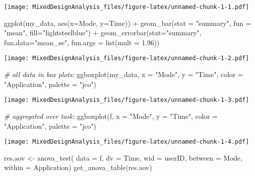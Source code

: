 \documentclass[
]{article}
\newenvironment{Shaded}{\begin{snugshade}}{\end{snugshade}}
\newcommand{\AttributeTok}[1]{\textcolor[rgb]{0.77,0.63,0.00}{#1}}
\newcommand{\CommentTok}[1]{\textcolor[rgb]{0.56,0.35,0.01}{\textit{#1}}}
\newcommand{\FloatTok}[1]{\textcolor[rgb]{0.00,0.00,0.81}{#1}}
\newcommand{\FunctionTok}[1]{\textcolor[rgb]{0.00,0.00,0.00}{#1}}
\newcommand{\NormalTok}[1]{#1}
\newcommand{\OtherTok}[1]{\textcolor[rgb]{0.56,0.35,0.01}{#1}}
\newcommand{\SpecialCharTok}[1]{\textcolor[rgb]{0.00,0.00,0.00}{#1}}
\newcommand{\StringTok}[1]{\textcolor[rgb]{0.31,0.60,0.02}{#1}}
\begin{document}
\texttt{[image: MixedDesignAnalysis\_files/figure-latex/unnamed-chunk-1-1.pdf]}

\begin{Shaded}
\begin{Highlighting}[]
\FunctionTok{ggplot}\NormalTok{(my\_data, }\FunctionTok{aes}\NormalTok{(}\AttributeTok{x=}\NormalTok{Mode, }\AttributeTok{y=}\NormalTok{Time)) }\SpecialCharTok{+} \FunctionTok{geom\_bar}\NormalTok{(}\AttributeTok{stat =} \StringTok{"summary"}\NormalTok{, }\AttributeTok{fun =} \StringTok{"mean"}\NormalTok{, }\AttributeTok{fill=}\StringTok{"lightsteelblue"}\NormalTok{) }\SpecialCharTok{+} \FunctionTok{geom\_errorbar}\NormalTok{(}\AttributeTok{stat=}\StringTok{"summary"}\NormalTok{, }\AttributeTok{fun.data=}\StringTok{"mean\_se"}\NormalTok{, }\AttributeTok{fun.args =} \FunctionTok{list}\NormalTok{(}\AttributeTok{mult =} \FloatTok{1.96}\NormalTok{))}
\end{Highlighting}
\end{Shaded}

\texttt{[image: MixedDesignAnalysis\_files/figure-latex/unnamed-chunk-1-2.pdf]}

\begin{Shaded}
\begin{Highlighting}[]
\CommentTok{\# all data in box plots: }
\FunctionTok{ggboxplot}\NormalTok{(my\_data, }\AttributeTok{x =} \StringTok{"Mode"}\NormalTok{, }\AttributeTok{y =} \StringTok{"Time"}\NormalTok{, }\AttributeTok{color =} \StringTok{"Application"}\NormalTok{, }\AttributeTok{palette =} \StringTok{"jco"}\NormalTok{)}
\end{Highlighting}
\end{Shaded}

\texttt{[image: MixedDesignAnalysis\_files/figure-latex/unnamed-chunk-1-3.pdf]}

\begin{Shaded}
\begin{Highlighting}[]
\CommentTok{\# aggregated over task: }
\FunctionTok{ggboxplot}\NormalTok{(f, }\AttributeTok{x =} \StringTok{"Mode"}\NormalTok{, }\AttributeTok{y =} \StringTok{"Time"}\NormalTok{, }\AttributeTok{color =} \StringTok{"Application"}\NormalTok{, }\AttributeTok{palette =} \StringTok{"jco"}\NormalTok{)}
\end{Highlighting}
\end{Shaded}

\texttt{[image: MixedDesignAnalysis\_files/figure-latex/unnamed-chunk-1-4.pdf]}

\begin{Shaded}
\begin{Highlighting}[]
\NormalTok{res.aov }\OtherTok{\textless{}{-}} \FunctionTok{anova\_test}\NormalTok{( }\AttributeTok{data =}\NormalTok{ f, }\AttributeTok{dv =}\NormalTok{ Time, }\AttributeTok{wid =}\NormalTok{ userID, }\AttributeTok{between =}\NormalTok{ Mode, }\AttributeTok{within =}\NormalTok{ Application)}
\FunctionTok{get\_anova\_table}\NormalTok{(res.aov)}
\end{Highlighting}
\end{Shaded}
\end{document}
